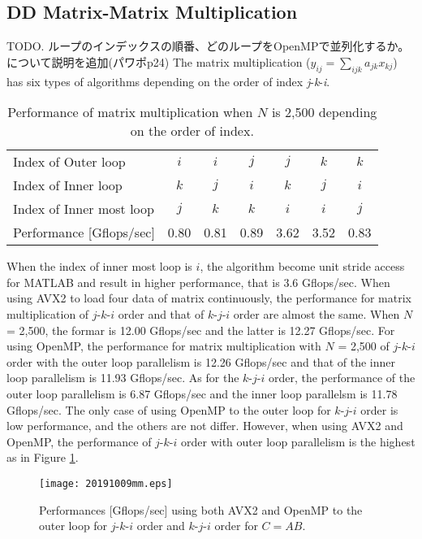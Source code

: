 \documentclass{IOS-Book-Article}
\begin{document}
\subsection{DD Matrix-Matrix Multiplication}
TODO. ループのインデックスの順番、どのループをOpenMPで並列化するか。について説明を追加(パワポp24)
The matrix multiplication ($y_{ij}=\sum_{ijk} a_{jk}x_{kj}$) has six types of algorithms depending on the order of index {\it j}-{\it k}-{\it i}.
\begin{table}[htbp]
  \centering
  \caption{Performance of matrix multiplication when $N$ is 2,500 depending on the order of index.}
  \label{mmindx}
  \small
  \begin{tabular}{l|cccccc}
    \hline
  Index of Outer loop          & $i$    & $i$    & $j$    & $j$    & $k$    & $k$    \\
  Index of Inner loop          & $k$    & $j$    & $i$    & $k$    & $j$    & $i$    \\
  Index of Inner most loop     & $j$    & $k$    & $k$    & $i$    & $i$    & $j$    \\
  Performance {[}Gflops/sec{]} &  0.80  &  0.81  &  0.89  &  3.62  &  3.52  & 0.83
  \\ \hline
  \end{tabular}
\end{table}

When the index of inner most loop is $i$, the algorithm become unit stride access for MATLAB and result in higher performance, that is 3.6 Gflops/sec.
When using AVX2 to load four data of matrix continuously, the performance for matrix multiplication of $j$-$k$-$i$ order and that of $k$-$j$-$i$ order are almost the same.
When $N$ = 2,500, the formar is 12.00 Gflops/sec and the latter is 12.27 Gflops/sec.
For using OpenMP, the performance for matrix multiplication with $N$ = 2,500 of $j$-$k$-$i$ order with the outer loop parallelism is 12.26 Gflops/sec
and that of the inner loop parallelism is 11.93 Gflops/sec.
As for the $k$-$j$-$i$ order, the performance of the outer loop parallelism is 6.87 Gflops/sec and the inner loop parallelsm is 11.78 Gflops/sec.
The only case of using OpenMP to the outer loop for $k$-$j$-$i$ order is low performance, and the others are not differ.
However, when using AVX2 and OpenMP, the performance of $j$-$k$-$i$ order with outer loop parallelism is the highest as in Figure \ref{figMM3}. 

\begin{figure}[htbp]
  \begin{center}
    \texttt{[image: 20191009mm.eps]}
         \caption{Performances [Gflops/sec] using both AVX2 and OpenMP to the outer loop for $j$-$k$-$i$ order and $k$-$j$-$i$ order for $C = AB$.}
    \label{figMM3}
  \end{center}
\end{figure}
\end{document}
